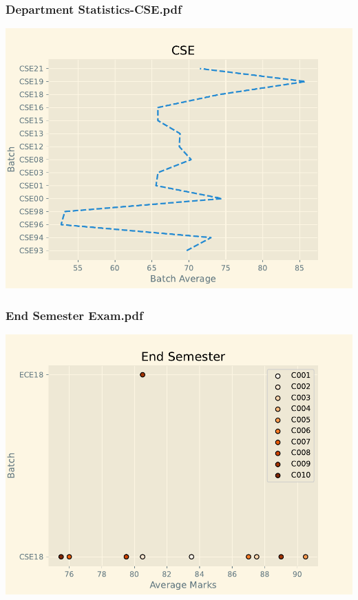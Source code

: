\subsubsection*{Department Statistics-CSE.pdf}
\includegraphics{outputs/Department Statistics-CSE.pdf}
\subsubsection*{End Semester Exam.pdf}
\includegraphics{outputs/End Semester Exam.pdf}
